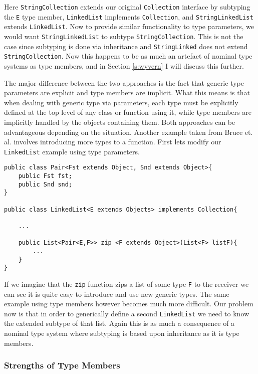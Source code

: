 \documentclass[11pt
              , a4paper
              , twoside
              , openright
              ]{report}
\numberwithin{case}{theorem}
\numberwithin{subcase}{case}
\begin{document}
Here \verb|StringCollection| extends our original \verb|Collection| interface by subtyping the \verb|E| type member, \verb|LinkedList| implements \verb|Collection|, and \verb|StringLinkedList| extends \verb|LinkedList|. Now to provide similar functionality to type parameters, we would want \verb|StringLinkedList| to subtype \verb|StringCollection|. This is not the case since subtyping is done via inheritance and \verb|StringLinked| does not extend \verb|StringCollection|. Now this happens to be as much an artefact of nominal type systems as type members, and in Section \ref{s:wyvern} I will discuss this further.

The major difference between the two approaches is the fact that generic type parameters are explicit and type members are implicit. What this means is that when dealing with generic type via parameters, each type must be explicitly defined at the top level of any class or function using it, while type members are implicitly handled by the objects containing them. Both approaches can be advantageous depending on the situation. Another example taken from Bruce et. al. \cite{Bruce:1998:SSA:646155.679691} involves introducing more types to a function. First lets modify our \verb|LinkedList| example using type parameters.
\begin{lstlisting}[mathescape, style=customlang]
public class Pair<Fst extends Object, Snd extends Object>{
	public Fst fst;
	public Snd snd;
}

public class LinkedList<E extends Objects> implements Collection{

	...
	
	public List<Pair<E,F>> zip <F extends Object>(List<F> listF){
		...
	}	
}
\end{lstlisting}
If we imagine that the \verb|zip| function zips a list of some type \verb|F| to the receiver we can see it is quite easy to introduce and use new generic types. The same example using type members however becomes much more difficult. Our problem now is that in order to generically define a second \verb|LinkedList| we need to know the extended subtype of that list. Again this is as much a consequence of a nominal type system where subtyping is based upon inheritance as it is type members. 

\subsubsection{Strengths of Type Members}
\end{document}
